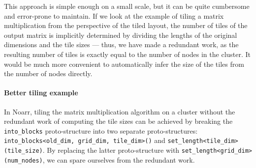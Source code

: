 This approach is simple enough on a small scale, but it can be quite cumbersome and error-prone to maintain.
If we look at the example of tiling a matrix multiplication from the perspective of the tiled layout,
the number of tiles of the output matrix is implicitly determined by dividing the lengths of the original dimensions and the tile sizes --- thus, we have made a redundant work, as the resulting number of tiles is exactly equal to the number of nodes in the cluster. It would be much more convenient to automatically infer the size of the tiles from the number of nodes directly.

\paragraph*{Better tiling example}
In Noarr, tiling the matrix multiplication algorithm on a cluster without the redundant work of computing the tile sizes can be achieved by breaking the \lstinline{into_blocks} proto-structure into two separate proto-structures: \lstinline{into_blocks<old_dim, grid_dim, tile_dim>()} and \lstinline{set_length<tile_dim>(tile_size)}. By replacing the latter proto-structure with \lstinline{set_length<grid_dim>(num_nodes)}, we can spare ourselves from the redundant work.





